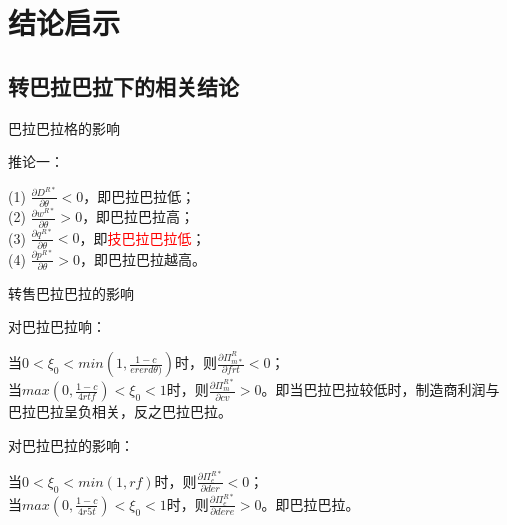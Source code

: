 \documentclass{beamer}
\begin{document}
\section{结论启示}
\subsection{转巴拉巴拉下的相关结论}
\begin{frame}{巴拉巴拉格的影响}
	\begin{large}
		\flushleft
		推论一：\\
		\vspace{0.2in}
	\end{large}
    \justifying
    (1) $\frac{\partial D^{R*}}{\partial \theta}<0$，即巴拉巴拉低；\\
    \vspace{0.1in}
	(2) $\frac{\partial w^{R*}}{\partial \theta}>0$，即巴拉巴拉高；\\
	\vspace{0.1in}
    (3) $\frac{\partial q^{R*}}{\partial \theta}<0$，即\textcolor{red}{技巴拉巴拉低}；\\
    \vspace{0.1in}
    (4) $\frac{\partial p^{R*}}{\partial \theta}>0$，即巴拉巴拉越高。
\end{frame}
\begin{frame}{转售巴拉巴拉的影响}
	\begin{large}
		\flushleft
		对巴拉巴拉响：\\
		\vspace{0.1in}
	\end{large}
	\justifying 当$0<\xi_{0}<min(1,\frac{1-c}{ererd\theta)})$时，则$\frac{\partial \Pi^{R}_{m*}}{\partial frt}<0$；\\当$max(0,\frac{1-c}{4rtf})<\xi_{0}<1$时，则$\frac{\partial \Pi^{R*}_{m}}{\partial cv}>0$。即当巴拉巴拉较低时，制造商利润与巴拉巴拉呈负相关，反之巴拉巴拉。\\
	\vspace{0.2in}
	\begin{large}
		\flushleft
		对巴拉巴拉的影响：\\
		\vspace{0.1in}
	\end{large}
	\justifying 当$0<\xi_{0}<min(1,rf)$时，则$\frac{\partial \Pi^{R*}_{e}}{\partial der}<0$；\\当$max(0,\frac{1-c}{4r5t})<\xi_{0}<1$时，则$\frac{\partial \Pi^{R*}_{e}}{\partial dere}>0$。即巴拉巴拉。
\end{frame}
\end{document}
